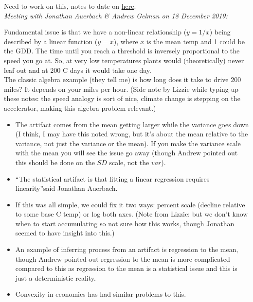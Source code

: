 \documentclass[11pt,letter]{article}
\begin{document}
Need to work on this, notes to date on \href{https://github.com/lizzieinvancouver/decsens/wiki/Statistical-artifacts-in-sensitivities}{here}.\\

\emph{Meeting with Jonathan Auerbach \& Andrew Gelman on 18 December 2019:} 

Fundamental issue is that we have a non-linear relationship ($y=1/x$) being described by a linear function ($y=x$), where $x$ is the mean temp and 1 could be the GDD. The time until you reach a threshold is inversely proportional to the speed you go at. So, at very low temperatures plants would (theoretically) never leaf out and at 200 C days it would take one day. \\

The classic algebra example (they tell me) is how long does it take to drive 200 miles? It depends on your miles per hour. (Side note by Lizzie while typing up these notes: the speed analogy is sort of nice, climate change is stepping on the accelerator, making this algebra problem relevant.)

\begin{itemize}
\item The artifact comes from the mean getting larger while the variance goes down (I think, I may have this noted wrong, but it's about the mean relative to the variance, not just the variance or the mean). If you make the variance scale with the mean you will see the issue go away (though Andrew pointed out this should be done on the $SD$ scale, not the $var$).
\item ``The statistical artifact is that fitting a linear regression requires linearity''said  Jonathan Auerbach.
\item If this was all simple, we could fix it two ways: percent scale (decline relative to some base C temp) or log both axes. (Note from Lizzie: but we don't know when to start accumulating so not sure how this works, though Jonathan seemed to have insight into this.)
\item An example of inferring process from an artifact is regression to the mean, though Andrew pointed out regression to the mean is more complicated compared to this as regression to the mean is a statistical issue and this is just a deterministic reality. 
\item Convexity in economics has had similar problems to this. 
\end{itemize}
\end{document}
